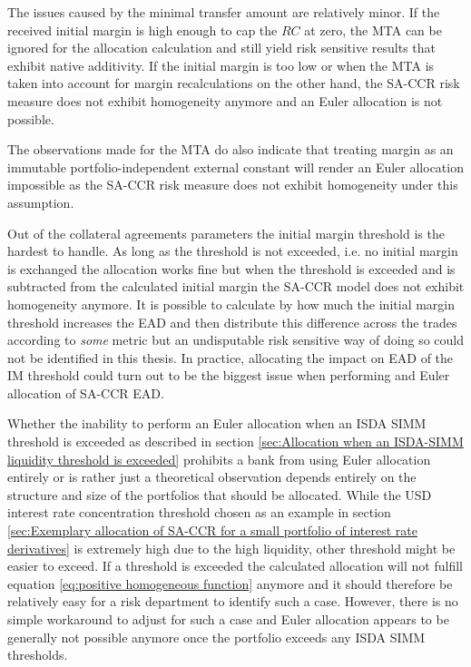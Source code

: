 \documentclass[../Thesis_AHoecherl.tex]{subfiles}
\begin{document}
    The issues caused by the minimal transfer amount are relatively minor.
    If the received initial margin is high enough to cap the $RC$ at zero, the MTA can be ignored for the allocation calculation and still yield risk sensitive results that exhibit native additivity. If the initial margin is too low or when the MTA is taken into account for margin recalculations on the other hand, the SA-CCR risk measure does not exhibit homogeneity anymore and an Euler allocation is not possible.
    
    The observations made for the MTA do also indicate that treating margin as an immutable portfolio-independent external constant will render an Euler allocation impossible as the SA-CCR risk measure does not exhibit homogeneity under this assumption.


    Out of the collateral agreements parameters the initial margin threshold is the hardest to handle. As long as the threshold is not exceeded, i.e. no initial margin is exchanged the allocation works fine but when the threshold is exceeded and is subtracted from the calculated initial margin the SA-CCR model does not exhibit homogeneity anymore.
    It is possible to calculate by how much the initial margin threshold increases the EAD and then distribute this difference across the trades according to \emph{some} metric but an undisputable risk sensitive way of doing so could not be identified in this thesis.
    In practice, allocating the impact on EAD of the IM threshold could turn out to be the biggest issue when performing and Euler allocation of SA-CCR EAD.

    Whether the inability to perform an Euler allocation when an ISDA SIMM threshold is exceeded as described in section \ref{sec:Allocation when an ISDA-SIMM liquidity threshold is exceeded} prohibits a bank from using Euler allocation entirely or is rather just a theoretical observation depends entirely on the structure and size of the portfolios that should be allocated.
    While the USD interest rate concentration threshold chosen as an example in section \ref{sec:Exemplary allocation of SA-CCR for a small portfolio of interest rate derivatives} is extremely high due to the high liquidity, other threshold might be easier to exceed. If a threshold is exceeded the calculated allocation will not fulfill equation \ref{eq:positive homogeneous function} anymore and it should therefore be relatively easy for a risk department to identify such a case. However, there is no simple workaround to adjust for such a case and Euler allocation appears to be generally not possible anymore once the portfolio exceeds any ISDA SIMM thresholds.

    
\end{document}
